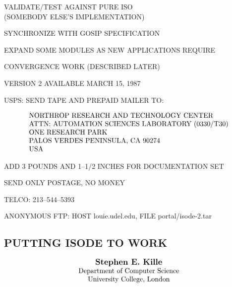 \begin{bwslide}

\begin{nrtc}
\item	VALIDATE/TEST AGAINST PURE ISO\\
	(SOMEBODY ELSE'S IMPLEMENTATION)

\item	SYNCHRONIZE WITH GOSIP SPECIFICATION

\item	EXPAND SOME MODULES AS NEW APPLICATIONS REQUIRE

\item	CONVERGENCE WORK (DESCRIBED LATER)
\end{nrtc}
\end{bwslide}


\begin{bwslide}

\begin{nrtc}
\item	VERSION 2 AVAILABLE MARCH 15, 1987

\item	USPS: SEND TAPE AND PREPAID MAILER TO:
\begin{small}
    \[\begin{tabular}{l}
	NORTHROP RESEARCH AND TECHNOLOGY CENTER\\
	ATTN: AUTOMATION SCIENCES LABORATORY (0330/T30)\\
	ONE RESEARCH PARK\\
	PALOS VERDES PENINSULA, CA  90274\\
	USA\\
    \end{tabular}\]
\end{small}
    \begin{nrtc}
    \item	ADD 3 POUNDS AND 1--1/2 INCHES FOR DOCUMENTATION SET

    \item	SEND ONLY POSTAGE, NO MONEY

    \item	TELCO: 213--544--5393
    \end{nrtc}

\item	ANONYMOUS FTP: HOST louie.udel.edu, FILE portal/isode-2.tar
\end{nrtc}
\end{bwslide}


\begin{bwslide}
\part	{PUTTING ISODE TO WORK}\large\bf

\vskip-0.5in
\[\begin{tabular}[t]{c}\large\bf
    Stephen E.~Kille\\
    Department of Computer Science\\
    University College, London
\end{tabular}\]
\end{bwslide}


